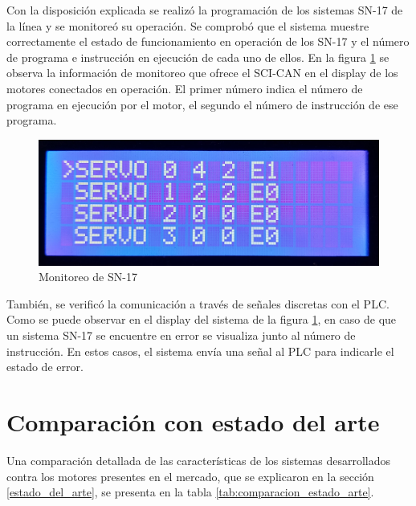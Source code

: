 Con la disposición explicada se realizó la programación de los sistemas SN-17 de la línea y se monitoreó su operación. Se comprobó que el sistema muestre correctamente el estado de funcionamiento en operación de los SN-17 y el número de programa e instrucción en ejecución de cada uno de ellos. En la figura \ref{fig:pantalla_monitoreo} se observa la información de monitoreo que ofrece el SCI-CAN en el display de los motores conectados en operación. El primer número indica el número de programa en ejecución por el motor, el segundo el número de instrucción de ese programa.

\begin{figure}[htbp]
	\centering
	\includegraphics[scale=0.1]{./Figures/menu_error.jpg}
	\caption{Monitoreo de SN-17}
	\label{fig:pantalla_monitoreo}
\end{figure}

También, se verificó la comunicación a través de señales discretas con el PLC. Como se puede observar en el display del sistema de la figura \ref{fig:pantalla_monitoreo}, en caso de que un sistema SN-17 se encuentre en error se visualiza junto al número de instrucción. En estos casos, el sistema envía una señal al PLC para indicarle el estado de error.

\section{Comparación con estado del arte}

Una comparación detallada de las características de los sistemas desarrollados contra los motores presentes en el mercado, que se explicaron en la sección \ref{estado_del_arte}, se presenta en la tabla \ref{tab:comparacion_estado_arte}.

